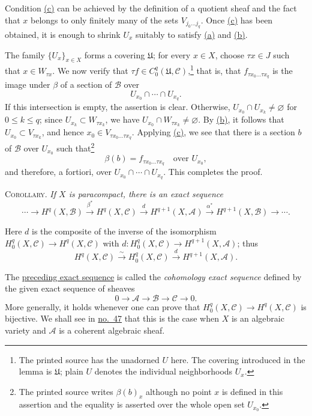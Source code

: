 Condition \hyperref[fac:I:3:no:25:lemma:2:item:c]{(c)} can be achieved by the definition of a quotient sheaf and the fact that $x$ belongs to only finitely many of the sets $V_{j_0\ldots j_q}$. Once \hyperref[fac:I:3:no:25:lemma:2:item:c]{(c)} has been obtained, it is enough to shrink $U_x$ suitably to satisfy \hyperref[fac:I:3:no:25:lemma:2:item:a]{(a)} and \hyperref[fac:I:3:no:25:lemma:2:item:b]{(b)}.

The family $\{U_x\}_{x\in X}$ forms a covering $\mathfrak{U}$; for every $x\in X$, choose $\tau x\in J$ such that $x\in W_{\tau x}$. We now verify that
$\tau f\in C_0^q(\mathfrak{U},\mathcal{C})$,\footnote{The printed source has the unadorned $U$ here. The covering introduced in the lemma is $\mathfrak{U}$; plain $U$ denotes the individual neighborhoods $U_x$.}
that is, that $f_{\tau x_0\ldots\tau x_q}$ is the image under $\beta$ of a section of $\mathcal{B}$ over
\[
U_{x_0}\cap\cdots\cap U_{x_q}.
\]
If this intersection is empty, the assertion is clear. Otherwise,
$U_{x_0}\cap U_{x_k}\neq\varnothing$ for $0\leq k\leq q$; since
$U_{x_k}\subset W_{\tau x_k}$, we have
$U_{x_0}\cap W_{\tau x_k}\neq\varnothing$. By \hyperref[fac:I:3:no:25:lemma:2:item:b]{(b)}, it follows that
$U_{x_0}\subset V_{\tau x_k}$, and hence
$x_0\in V_{\tau x_0\ldots\tau x_q}$. Applying \hyperref[fac:I:3:no:25:lemma:2:item:c]{(c)}, we see that there is a section $b$ of $\mathcal{B}$ over $U_{x_0}$ such that\footnote{The printed source writes $\beta(b)_x$ although no point $x$ is defined in this assertion and the equality is asserted over the whole open set $U_{x_0}$.}
\[
\beta(b)=f_{\tau x_0\ldots\tau x_q}\quad\text{over }U_{x_0},
\]
and therefore, a fortiori, over $U_{x_0}\cap\cdots\cap U_{x_q}$. This completes the proof.

\label{fac:I:3:no:25:prop:7:cor}
\textsc{Corollary.} \textit{If $X$ is paracompact, there is an exact sequence}
\[
\cdots\longrightarrow H^q(X,\mathcal{B})
\xrightarrow{\beta^*}H^q(X,\mathcal{C})
\xrightarrow{d}H^{q+1}(X,\mathcal{A})
\xrightarrow{\alpha^*}H^{q+1}(X,\mathcal{B})
\longrightarrow\cdots.
\]

Here $d$ is the composite of the inverse of the isomorphism
$H_0^q(X,\mathcal{C})\to H^q(X,\mathcal{C})$ with
$d:H_0^q(X,\mathcal{C})\to H^{q+1}(X,\mathcal{A})$; thus
\[
H^q(X,\mathcal{C})
\xrightarrow{\sim}
H_0^q(X,\mathcal{C})
\xrightarrow{d}H^{q+1}(X,\mathcal{A}).
\]

The \hyperref[fac:I:3:no:25:prop:7:cor]{preceding exact sequence} is called the \textit{cohomology exact sequence} defined by the given exact sequence of sheaves
\[
0\longrightarrow\mathcal{A}\longrightarrow\mathcal{B}
\longrightarrow\mathcal{C}\longrightarrow0.
\]
More generally, it holds whenever one can prove that
$H_0^q(X,\mathcal{C})\to H^q(X,\mathcal{C})$ is bijective. We shall see in \hyperref[fac:II:3:no:47]{no.~47} that this is the case when $X$ is an algebraic variety and $\mathcal{A}$ is a coherent algebraic sheaf.
